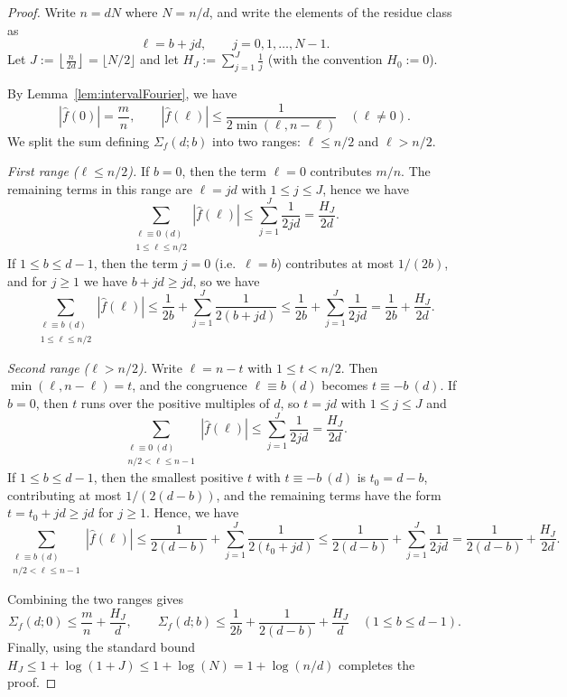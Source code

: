 \documentclass[12pt]{amsart}
\begin{document}
\begin{proof}
Write $n=dN$ where $N=n/d$, and write the elements of the residue class as
\[
\ell=b+jd,\qquad j=0,1,\dots,N-1.
\]
Let $J:=\left\lfloor \frac{n}{2d}\right\rfloor=\lfloor N/2\rfloor$ and let $H_J:=\sum_{j=1}^J \frac{1}{j}$
(with the convention $H_0:=0$).

By Lemma~\ref{lem:intervalFourier}, we have
\[
|\widehat f(0)|=\frac{m}{n},
\qquad
|\widehat f(\ell)|\le \frac{1}{2\min(\ell,n-\ell)}\quad(\ell\neq 0).
\]
We split the sum defining $\Sigma_f(d;b)$ into two ranges: $\ell\le n/2$ and $\ell>n/2$.

\smallskip
\noindent\emph{First range ($\ell\le n/2$).}
If $b=0$, then the term $\ell=0$ contributes $m/n$. The remaining terms in this range are $\ell=jd$ with
$1\le j\le J$, hence we have
\[
\sum_{\substack{\ell\equiv 0\ (d)\\ 1\le \ell\le n/2}}|\widehat f(\ell)|
\le \sum_{j=1}^J \frac{1}{2jd}
=\frac{H_J}{2d}.
\]
If $1\le b\le d-1$, then the term $j=0$ (i.e.\ $\ell=b$) contributes at most $1/(2b)$, and for $j\ge 1$ we have
$b+jd\ge jd$, so we have
\[
\sum_{\substack{\ell\equiv b\ (d)\\ 1\le \ell\le n/2}}|\widehat f(\ell)|
\le \frac{1}{2b}+\sum_{j=1}^J \frac{1}{2(b+jd)}
\le \frac{1}{2b}+\sum_{j=1}^J \frac{1}{2jd}
=\frac{1}{2b}+\frac{H_J}{2d}.
\]

\smallskip
\noindent\emph{Second range ($\ell>n/2$).}
Write $\ell=n-t$ with $1\le t<n/2$. Then $\min(\ell,n-\ell)=t$, and the congruence $\ell\equiv b\ (d)$ becomes
$t\equiv -b\ (d)$.
If $b=0$, then $t$ runs over the positive multiples of $d$, so $t=jd$ with $1\le j\le J$ and
\[
\sum_{\substack{\ell\equiv 0\ (d)\\ n/2<\ell\le n-1}}|\widehat f(\ell)|
\le \sum_{j=1}^J \frac{1}{2jd}
=\frac{H_J}{2d}.
\]
If $1\le b\le d-1$, then the smallest positive $t$ with $t\equiv -b\ (d)$ is $t_0=d-b$, contributing at most
$1/(2(d-b))$, and the remaining terms have the form $t=t_0+jd\ge jd$ for $j\ge 1$. Hence, we have
\[
\sum_{\substack{\ell\equiv b\ (d)\\ n/2<\ell\le n-1}}|\widehat f(\ell)|
\le \frac{1}{2(d-b)}+\sum_{j=1}^J \frac{1}{2(t_0+jd)}
\le \frac{1}{2(d-b)}+\sum_{j=1}^J \frac{1}{2jd}
=\frac{1}{2(d-b)}+\frac{H_J}{2d}.
\]

\smallskip
Combining the two ranges gives
\[
\Sigma_f(d;0)\le \frac{m}{n}+\frac{H_J}{d},
\qquad
\Sigma_f(d;b)\le \frac{1}{2b}+\frac{1}{2(d-b)}+\frac{H_J}{d}\quad(1\le b\le d-1).
\]
Finally, using the standard bound $H_J\le 1+\log(1+J)\le 1+\log(N)=1+\log(n/d)$ completes the proof.
\end{proof}
\end{document}
